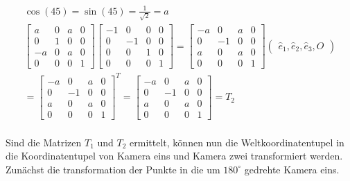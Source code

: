 \begin{gather}
	\cos(45)=\sin(45)=\frac{1}{\sqrt{2}} = a\\
	\begin{bmatrix}
		a&0&a&0\\
		0&1&0&0\\
		-a&0&a&0\\
		0&0&0&1
	\end{bmatrix}
	\begin{bmatrix}
		-1&0&0&0\\
		0&-1&0&0\\
		0&0&1&0\\
		0&0&0&1
	\end{bmatrix}
	=\begin{bmatrix}
		-a&0&a&0\\
		0&-1&0&0\\
		a&0&a&0\\
		0&0&0&1
	\end{bmatrix}
	\begin{pmatrix}
		\hat{e}_1,\hat{e}_2,\hat{e}_3,O
	\end{pmatrix}\\
	=\begin{bmatrix}
	-a&0&a&0\\
	0&-1&0&0\\
	a&0&a&0\\
	0&0&0&1
	\end{bmatrix}^T
	=
	\begin{bmatrix}
		-a&0&a&0\\
		0&-1&0&0\\
		a&0&a&0\\
		0&0&0&1
	\end{bmatrix}
	= T_2
\end{gather}\\


Sind die Matrizen \ensuremath{T_1} und \ensuremath{T_2} ermittelt, können nun die Weltkoordinatentupel in die Koordinatentupel von Kamera eins und Kamera zwei transformiert werden. Zunächst die transformation der Punkte in die um \ensuremath{180^\circ} gedrehte Kamera eins.

